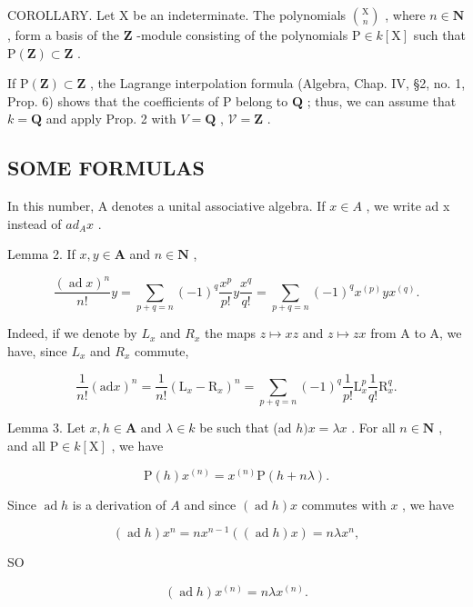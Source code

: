 COROLLARY. Let \(\mathrm{X}\) be an indeterminate. The polynomials \(\binom{\mathrm{X}}{n}\) , where \(n \in \mathbf{N}\) , form a basis of the \(\mathbf{Z}\) -module consisting of the polynomials \(\mathrm{P} \in k[\mathrm{X}]\) such that \(\mathrm{P}(\mathbf{Z}) \subset \mathbf{Z}\) .

If \(\mathrm{P}(\mathbf{Z}) \subset \mathbf{Z}\) , the Lagrange interpolation formula (Algebra, Chap. IV, §2, no. 1, Prop. 6) shows that the coefficients of P belong to \(\mathbf{Q}\) ; thus, we can assume that \(k = \mathbf{Q}\) and apply Prop. 2 with \(V = \mathbf{Q}\) , \(\mathcal{V} = \mathbf{Z}\) .

\subsection{SOME FORMULAS}

In this number, A denotes a unital associative algebra. If \(x \in A\) , we write ad x instead of \(ad_{A}x\) .

Lemma 2. If \(x, y \in \mathbf{A}\) and \(n \in \mathbf{N}\) ,

\[
\frac {(\operatorname{ad} x) ^ {n}}{n !} y = \sum_ {p + q = n} (- 1) ^ {q} \frac {x ^ {p}}{p !} y \frac {x ^ {q}}{q !} = \sum_ {p + q = n} (- 1) ^ {q} x ^ {(p)} y x ^ {(q)}.\tag{11}
\]

Indeed, if we denote by \(L_{x}\) and \(R_{x}\) the maps \(z \mapsto xz\) and \(z \mapsto zx\) from A to A, we have, since \(L_{x}\) and \(R_{x}\) commute,

\[
\frac {1}{n !} (\mathrm{ad} x) ^ {n} = \frac {1}{n !} (\mathrm{L} _ {x} - \mathrm{R} _ {x}) ^ {n} = \sum_ {p + q = n} (- 1) ^ {q} \frac {1}{p !} \mathrm{L} _ {x} ^ {p} \frac {1}{q !} \mathrm{R} _ {x} ^ {q}.
\]

Lemma 3. Let \(x, h \in \mathbf{A}\) and \(\lambda \in k\) be such that (ad \(h)x = \lambda x\) . For all \(n \in \mathbf{N}\) , and all \(\mathrm{P} \in k[\mathrm{X}]\) , we have

\[
\mathrm{P} (h) x ^ {(n)} = x ^ {(n)} \mathrm{P} (h + n \lambda).\tag{12}
\]

Since \(\operatorname{ad} h\) is a derivation of \(A\) and since \((\operatorname{ad} h)x\) commutes with \(x\) , we have

\[
(\operatorname{ad} h) x ^ {n} = n x ^ {n - 1} ((\operatorname{ad} h) x) = n \lambda x ^ {n},\tag{13}
\]

SO

\[
(\operatorname{ad} h) x ^ {(n)} = n \lambda x ^ {(n)}.
\]

